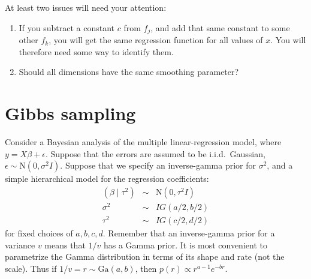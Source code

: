 \documentclass{mynotes}
\newcommand{\N}{\mbox{N}}
\begin{document}
At least two issues will need your attention:
\begin{enumerate}
\item If you subtract a constant $c$ from $f_j$, and add that same constant to some other $f_k$, you will get the same regression function for all values of $x$.  You will therefore need some way to identify them.
\item Should all dimensions have the same smoothing parameter?
\end{enumerate}


\section{Gibbs sampling}

Consider a Bayesian analysis of the multiple linear-regression model, where $y = X\beta + \epsilon$.  Suppose that the errors are assumed to be i.i.d.~Gaussian, $\epsilon \sim \N(0, \sigma^2 I)$.  Suppose that we specify an inverse-gamma prior for $\sigma^2$, and a simple hierarchical model for the regression coefficients:
\begin{eqnarray*}
(\beta \mid \tau^2) &\sim& \N(0, \tau^2 I) \\
\sigma^2 &\sim& IG(a/2, b/2) \\
\tau^2 &\sim& IG(c/2, d/2)
\end{eqnarray*}
for fixed choices of $a,b,c,d$.
Remember that an inverse-gamma prior for a variance $v$ means that $1/v$ has a Gamma prior.  It is most convenient to parametrize the Gamma distribution in terms of its shape and rate (not the scale).  Thus if $1/v = r \sim \mbox{Ga}(a, b)$, then $p(r) \propto r^{a-1} e^{-br}$.
\end{document}
